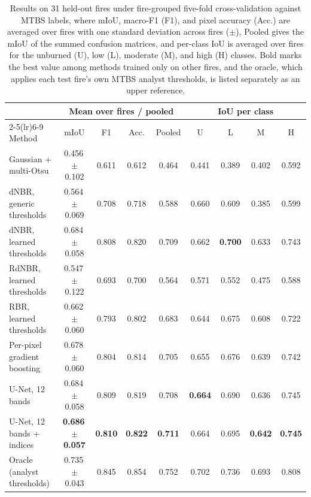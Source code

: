 \begin{table}[t]
\centering
\small
\setlength{\tabcolsep}{3.5pt}
\begin{tabular}{lcccccccc}
\toprule
 & \multicolumn{4}{c}{Mean over fires / pooled} & \multicolumn{4}{c}{IoU per class} \\
\cmidrule(lr){2-5}\cmidrule(lr){6-9}
Method & mIoU & F1 & Acc. & Pooled & U & L & M & H \\
\midrule
Gaussian + multi-Otsu & 0.456\,{\scriptsize$\pm$0.102} & 0.611 & 0.612 & 0.464 & 0.441 & 0.389 & 0.402 & 0.592 \\
dNBR, generic thresholds & 0.564\,{\scriptsize$\pm$0.069} & 0.708 & 0.718 & 0.588 & 0.660 & 0.609 & 0.385 & 0.599 \\
dNBR, learned thresholds & 0.684\,{\scriptsize$\pm$0.058} & 0.808 & 0.820 & 0.709 & 0.662 & \textbf{0.700} & 0.633 & 0.743 \\
RdNBR, learned thresholds & 0.547\,{\scriptsize$\pm$0.122} & 0.693 & 0.700 & 0.564 & 0.571 & 0.552 & 0.475 & 0.588 \\
RBR, learned thresholds & 0.662\,{\scriptsize$\pm$0.060} & 0.793 & 0.802 & 0.683 & 0.644 & 0.675 & 0.608 & 0.722 \\
Per-pixel gradient boosting & 0.678\,{\scriptsize$\pm$0.060} & 0.804 & 0.814 & 0.705 & 0.655 & 0.676 & 0.639 & 0.742 \\
U-Net, 12 bands & 0.684\,{\scriptsize$\pm$0.058} & 0.809 & 0.819 & 0.708 & \textbf{0.664} & 0.690 & 0.636 & 0.745 \\
U-Net, 12 bands + indices & \textbf{0.686\,{\scriptsize$\pm$0.057}} & \textbf{0.810} & \textbf{0.822} & \textbf{0.711} & 0.664 & 0.695 & \textbf{0.642} & \textbf{0.745} \\
\midrule
Oracle (analyst thresholds) & 0.735\,{\scriptsize$\pm$0.043} & 0.845 & 0.854 & 0.752 & 0.702 & 0.736 & 0.693 & 0.808 \\
\bottomrule
\end{tabular}
\caption{Results on 31 held-out fires under fire-grouped five-fold cross-validation against MTBS labels, where mIoU, macro-F1 (F1), and pixel accuracy (Acc.) are averaged over fires with one standard deviation across fires ($\pm$), Pooled gives the mIoU of the summed confusion matrices, and per-class IoU is averaged over fires for the unburned (U), low (L), moderate (M), and high (H) classes. Bold marks the best value among methods trained only on other fires, and the oracle, which applies each test fire's own MTBS analyst thresholds, is listed separately as an upper reference.}
\label{tab:main}
\end{table}
